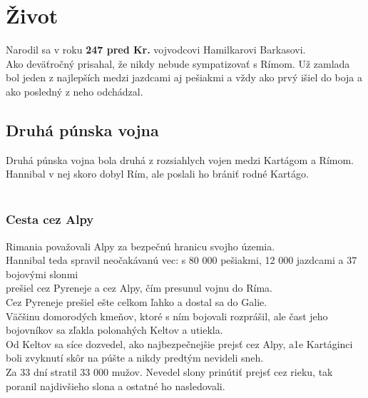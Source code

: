 \documentclass{article}
\begin{document}
\section{Život}
\label{sec:life}
Narodil sa v roku \textbf{247 pred Kr.} vojvodcovi Hamilkarovi Barkasovi.\\
Ako deväťročný prisahal, že nikdy nebude sympatizovať s Rímom.
Už zamlada bol jeden z najlepších medzi jazdcami aj pešiakmi a vždy ako  prvý išiel do boja a ako posledný z neho odchádzal.
\subsection{Druhá púnska vojna}
\label{subsec:secondpunianwar}
Druhá púnska vojna bola druhá z rozsiahlych vojen medzi Kartágom a Rímom.
Hannibal v nej skoro dobyl Rím, ale poslali ho brániť rodné Kartágo.\\\\
\subsubsection{Cesta cez Alpy}
\label{subsubsec:alpine}
Rimania považovali Alpy za bezpečnú hranicu svojho územia. \\Hannibal teda spravil neočakávanú vec: s 80 000 pešiakmi, 12 000 jazdcami a 37 bojovými slonmi \\prešiel cez Pyreneje a cez Alpy, čím presunul vojnu do Ríma.
\\Cez Pyreneje prešiel ešte celkom ľahko a dostal sa do Galie. \\
Väčšinu domorodých kmeňov, ktoré s ním bojovali rozprášil, ale čast jeho bojovníkov sa zľakla polonahých Keltov a utiekla.\\
Od Keltov sa síce dozvedel, ako najbezpečnejšie prejsť cez Alpy, a1e Kartáginci boli zvyknutí skôr na púšte a nikdy predtým nevideli sneh.\\
Za 33 dní stratil 33 000 mužov. Nevedel slony prinútiť prejsť cez rieku, tak poranil najdivšieho slona a ostatné ho nasledovali.\\
\end{document}
